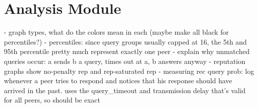\section{Analysis Module}
- graph types, what do the colors mean in each (maybe make all black for
  percentiles?)
- percentiles: since query groups usually capped at 16, the 5th and 95th
  percentile pretty much represent exactly one peer
- explain why unmatched queries occur: a sends b a query, times out at a, b
  answers anyway
- reputation graphs show no-penalty rep and rep-saturated rep
- measuring rec query prob: log whenever a peer tries to respond and notices
  that his response should have arrived in the past. uses the query_timeout
  and transmission delay that's valid for all peers, so should be exact
